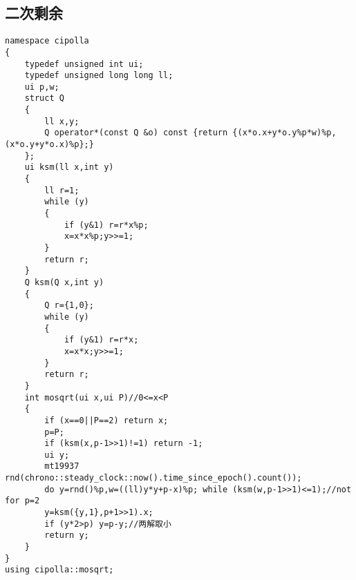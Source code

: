 \documentclass[12pt]{ctexart}
\begin{document}
\subsection{二次剩余}

\begin{lstlisting}
namespace cipolla
{
	typedef unsigned int ui;
	typedef unsigned long long ll;
	ui p,w;
	struct Q
	{
		ll x,y;
		Q operator*(const Q &o) const {return {(x*o.x+y*o.y%p*w)%p,(x*o.y+y*o.x)%p};}
	};
	ui ksm(ll x,int y)
	{
		ll r=1;
		while (y)
		{
			if (y&1) r=r*x%p;
			x=x*x%p;y>>=1;
		}
		return r;
	}
	Q ksm(Q x,int y)
	{
		Q r={1,0};
		while (y)
		{
			if (y&1) r=r*x;
			x=x*x;y>>=1;
		}
		return r;
	}
	int mosqrt(ui x,ui P)//0<=x<P
	{
		if (x==0||P==2) return x;
		p=P;
		if (ksm(x,p-1>>1)!=1) return -1;
		ui y;
		mt19937 rnd(chrono::steady_clock::now().time_since_epoch().count());
		do y=rnd()%p,w=((ll)y*y+p-x)%p; while (ksm(w,p-1>>1)<=1);//not for p=2
		y=ksm({y,1},p+1>>1).x;
		if (y*2>p) y=p-y;//两解取小
		return y;
	}
}
using cipolla::mosqrt;
\end{lstlisting}
\end{document}
